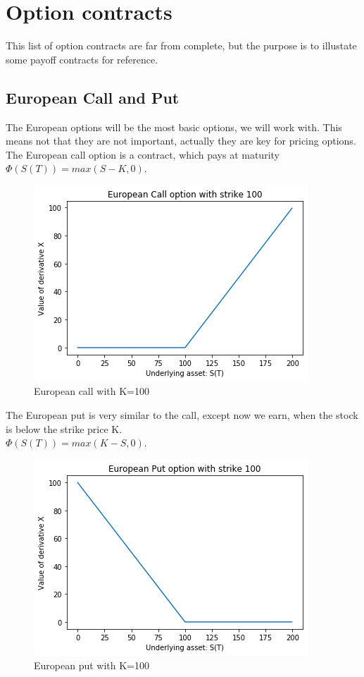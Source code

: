 
\chapter{Option contracts} %

\label{AppendixA} %
This list of option contracts are far from complete, but the purpose is to illustate some payoff contracts for reference.

\section{European Call and Put}
The European options will be the most basic options, we will work with. This means not that they are not important, actually they are key for pricing options. The European call option is a contract, which pays at maturity $\Phi(S(T))=max(S-K,0)$. 
\begin{figure}[h]
\centering
\includegraphics{Figures/euroCall.png}
\decoRule
\caption[]{European call with K=100}
\label{fig:EuroCall}
\end{figure}

The European put is very similar to the call, except now we earn, when the stock is below the strike price K.\\
$\Phi(S(T))=max(K-S,0)$.
\begin{figure}[h]
\centering
\includegraphics{Figures/euroPut.png}
\decoRule
\caption[]{European put with K=100}
\label{fig:EuroPut}
\end{figure}